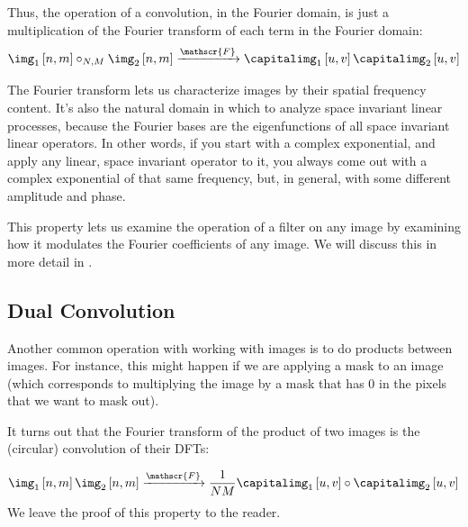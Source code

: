 Thus, the operation of a convolution, in the Fourier domain, is just a multiplication of the Fourier transform of each term in the
Fourier domain:
\begin{equation}
	\img_1 \left[n,m\right] \circ_{N,M} \img_2 \left[n,m\right]
	\xrightarrow{\mathscr{F}}
	\capitalimg_1 \left[u,v\right] \capitalimg_2 \left[u,v\right]
\end{equation}

The Fourier transform lets us characterize images by their spatial
frequency content.  It's also the natural domain in which to analyze
space invariant linear processes, because the Fourier bases are the
eigenfunctions of all space invariant linear operators.  In other
words, if you start with a complex exponential, and apply any linear,
space invariant operator to it, you always come out with a complex
exponential of that same frequency, but, in general, with some
different amplitude and phase.

This property lets us examine the operation of a filter on any image
by examining how it modulates the Fourier coefficients of any image.  We will discuss this in more detail in \sect{\ref{sect:transfer_function}}.


\subsection{Dual Convolution}
\label{section:dualconv}

Another common operation with working with images is to do products between images. For instance, this might happen if we are applying a mask to an image (which corresponds to multiplying the image by a mask that has 0 in the pixels that we want to mask out).

It turns out that the Fourier transform of the product of two images
is the (circular) convolution of their DFTs:

\begin{equation}
	\img_1 \left[n,m\right] \img_2 \left[n,m\right]
	\xrightarrow{\mathscr{F}}
	\frac{1}{NM} \capitalimg_1 \left[u,v\right] \circ \capitalimg_2 \left[u,v\right]
\end{equation}
We leave the proof of this property to the reader.


